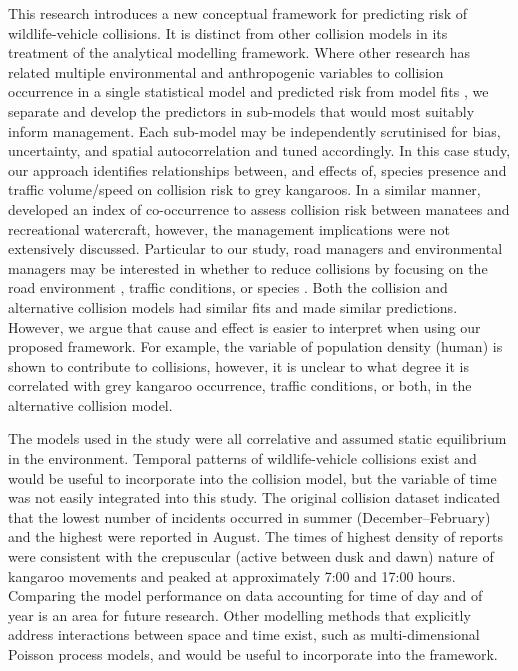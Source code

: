 This research introduces a new conceptual framework for predicting risk of wildlife-vehicle collisions. It is distinct from other collision models in its treatment of the analytical modelling framework. Where other research has related multiple environmental and anthropogenic variables to collision occurrence in a single statistical model \citep[e.g.][]{lee04,ramp05,kloc06,litv08,guns09,roge09} and predicted risk from model fits \citep[e.g.][]{malo04,sudh09,guns12}, we separate and develop the predictors in sub-models that would most suitably inform management. Each sub-model may be independently scrutinised for bias, uncertainty, and spatial autocorrelation and tuned accordingly. In this case study, our approach identifies relationships between, and effects of, species presence and traffic volume/speed on collision risk to grey kangaroos. In a similar manner, \cite{baud13} developed an index of co-occurrence to assess collision risk between manatees and recreational watercraft, however, the management implications were not extensively discussed. Particular to our study, road managers and environmental managers may be interested in whether to reduce collisions by focusing on the road environment \citep[e.g.][]{clev01,jaeg04,bond08,bond13}, traffic conditions, or species \citep[e.g.][]{huij03,huij06}. Both the collision and alternative collision models had similar fits and made similar predictions. However, we argue that cause and effect is easier to interpret when using our proposed framework. For example, the variable of population density (human) is shown to contribute to collisions, however, it is unclear to what degree it is correlated with grey kangaroo occurrence, traffic conditions, or both, in the alternative collision model.

The models used in the study were all correlative and assumed static equilibrium in the environment. Temporal patterns of wildlife-vehicle collisions exist and would be useful to incorporate into the collision model, but the variable of time was not easily integrated into this study. The original collision dataset indicated that the lowest number of incidents occurred in summer (December--February) and the highest were reported in August. The times of highest density of reports were consistent with the crepuscular (active between dusk and dawn) nature of kangaroo movements \citep{mccu00} and peaked at approximately 7:00 and 17:00 hours. Comparing the model performance on data accounting for time of day and of year is an area for future research. Other modelling methods that explicitly address interactions between space and time exist, such as multi-dimensional Poisson process models, and would be useful to incorporate into the framework.

